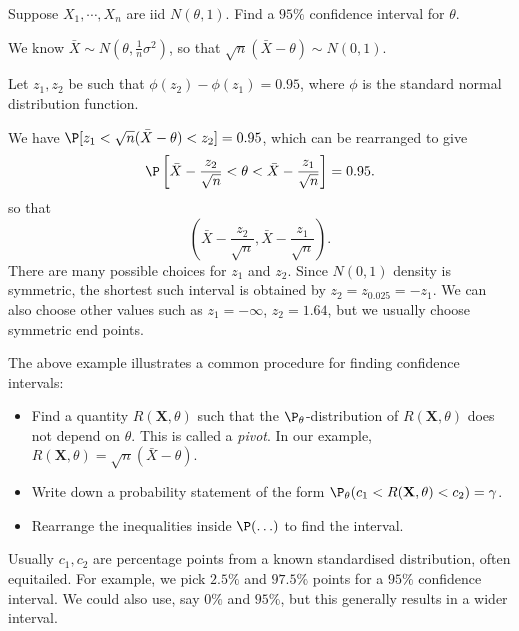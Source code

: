 \documentclass[a4paper]{article}
\begin{document}
\begin{eg}
  Suppose $X_1, \cdots, X_n$ are iid $N(\theta, 1)$. Find a $95\%$ confidence interval for $\theta$.

  We know $\bar X \sim N(\theta, \frac{1}{n}\sigma^2)$, so that $\sqrt{n}(\bar X - \theta)\sim N(0, 1)$.

  Let $z_1, z_2$ be such that $\phi(z_2) - \phi(z_1) = 0.95$, where $\phi$ is the standard normal distribution function.

  We have $\P[z_1 < \sqrt{n}(\bar X - \theta) < z_2] = 0.95$, which can be rearranged to give
  \[
    \P\left[\bar X - \frac{z_2}{\sqrt{n}} < \theta < \bar X - \frac{z_1}{\sqrt{n}}\right] = 0.95.
  \]
  so that
  \[
    \left(\bar X - \frac{z_2}{\sqrt{n}}, \bar X - \frac{z_1}{\sqrt{n}}\right).
  \]
  There are many possible choices for $z_1$ and $z_2$. Since $N(0, 1)$ density is symmetric, the shortest such interval is obtained by $z_2 = z_{0.025} = -z_1$. We can also choose other values such as $z_1 = -\infty$, $z_2 = 1.64$, but we usually choose symmetric end points.
\end{eg}
The above example illustrates a common procedure for finding confidence intervals:
\begin{itemize}
  \item Find a quantity $R(\mathbf{X}, \theta)$ such that the $\P_\theta$-distribution of $R(\mathbf{X}, \theta)$ does not depend on $\theta$. This is called a \emph{pivot}. In our example, $R(\mathbf{X}, \theta) = \sqrt{n}(\bar X - \theta)$.
  \item Write down a probability statement of the form $\P_\theta(c_1 < R(\mathbf{X}, \theta) < c_2) = \gamma$.
  \item Rearrange the inequalities inside $\P(\ldots)$ to find the interval.
\end{itemize}
Usually $c_1, c_2$ are percentage points from a known standardised distribution, often equitailed. For example, we pick $2.5\%$ and $97.5\%$ points for a $95\%$ confidence interval. We could also use, say $0\%$ and $95\%$, but this generally results in a wider interval.
\end{document}
